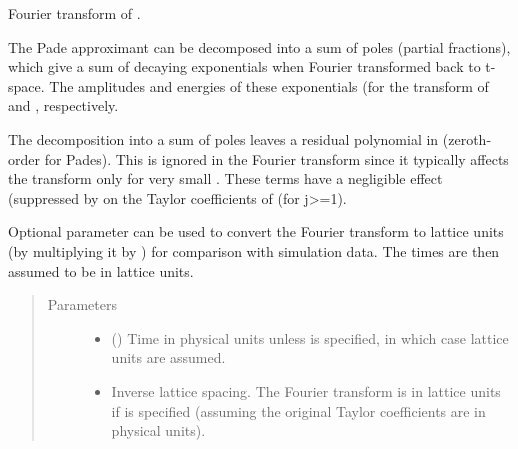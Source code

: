 \documentclass[letterpaper,10pt,english]{sphinxmanual}
\begin{document}
\begin{fulllineitems}
\begin{fulllineitems}
\end{fulllineitems}


\begin{fulllineitems}
\label{\detokenize{g2tools:g2tools.vacpol.FT}}
Fourier transform of .

The Pade approximant can be decomposed into a sum of poles (partial
fractions), which give a sum of decaying exponentials when Fourier
transformed back to t-space. The amplitudes and energies of these
exponentials (for the transform of  and , respectively.

The decomposition into a sum of poles leaves a residual polynomial in
 (zeroth-order for  Pades). This is ignored in the
Fourier transform since it typically affects the transform only for
very small . These terms have a negligible effect (suppressed by
 on the Taylor coefficients  of 
(for j\textgreater{}=1).

Optional parameter  can be used to convert the Fourier
transform to lattice units (by multiplying it by ) for
comparison with simulation data. The times  are then
assumed to be in lattice units.
\begin{quote}\begin{description}
\item[{Parameters}] \leavevmode\begin{itemize}
\item {} 
 (\sphinxstyleliteralemphasis{, }) \textendash{} Time in physical units unless 
is specified, in which case lattice units are assumed.

\item {} 
 \textendash{} Inverse lattice spacing. The Fourier transform is in lattice
units if  is specified (assuming the original
Taylor coefficients are in physical units).

\end{itemize}

\end{description}\end{quote}


\end{fulllineitems}
\end{fulllineitems}
\end{document}
